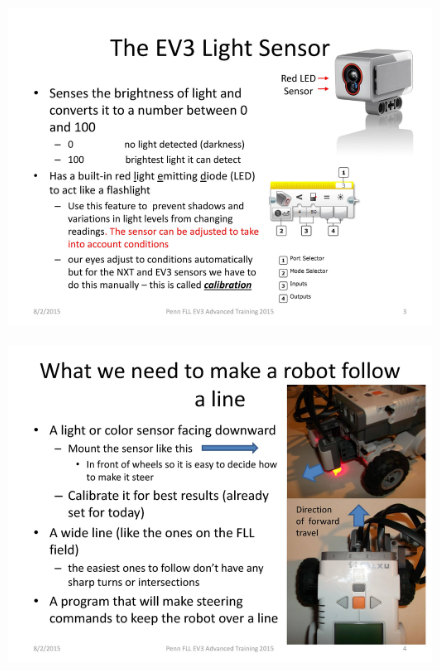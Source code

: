 \documentclass[11pt]{beamer}
\begin{document}
\begin{frame}
\begin{figure}
\includegraphics[scale=0.4]{ev3advanced2015/file-page3}
\end{figure}
\end{frame}

\begin{frame}
\begin{figure}
\includegraphics[scale=0.4]{ev3advanced2015/file-page4}
\end{figure}
\end{frame}
\end{document}
